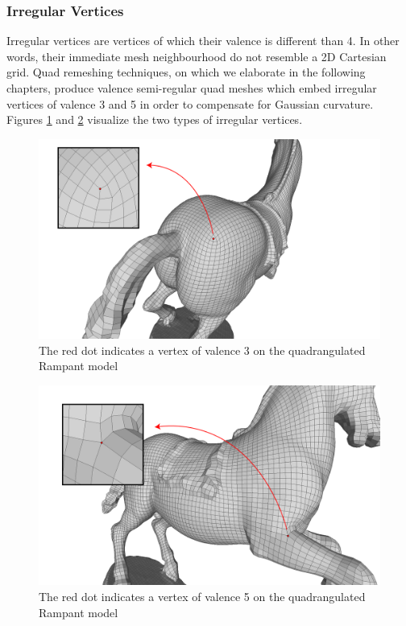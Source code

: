 \subsubsection{Irregular Vertices}
Irregular vertices are vertices of which their valence is different than 4. In other words, their immediate mesh neighbourhood do not resemble a 2D Cartesian grid. Quad remeshing techniques, on which we elaborate in the following chapters, produce valence semi-regular quad meshes which embed irregular vertices of valence 3 and 5 in order to compensate for Gaussian curvature. Figures \ref{fig:valence_3} and \ref{fig:valence_5} visualize the two types of irregular vertices.
\begin{figure}[ht]
\centering
\includegraphics[width=13cm]{figures/valence_3.png}
\caption[Irregular vertex of valence 3]{The red dot indicates a vertex of valence 3 on the quadrangulated Rampant model}
\label{fig:valence_3}
\end{figure}
\begin{figure}[ht]
\centering
\includegraphics[width=13cm]{figures/valence_5.png}
\caption[Irregular vertex of valence 5]{The red dot indicates a vertex of valence 5 on the quadrangulated Rampant model}
\label{fig:valence_5}
\end{figure}
